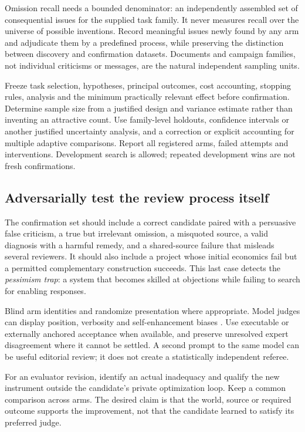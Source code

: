 Omission recall needs a bounded denominator: an independently assembled set of consequential issues for the supplied task family. It never measures recall over the universe of possible inventions. Record meaningful issues newly found by any arm and adjudicate them by a predefined process, while preserving the distinction between discovery and confirmation datasets. Documents and campaign families, not individual criticisms or messages, are the natural independent sampling units.

Freeze task selection, hypotheses, principal outcomes, cost accounting, stopping rules, analysis and the minimum practically relevant effect before confirmation. Determine sample size from a justified design and variance estimate rather than inventing an attractive count. Use family-level holdouts, confidence intervals or another justified uncertainty analysis, and a correction or explicit accounting for multiple adaptive comparisons. Report all registered arms, failed attempts and interventions. Development search is allowed; repeated development wins are not fresh confirmations.

\subsection{Adversarially test the review process itself}
The confirmation set should include a correct candidate paired with a persuasive false criticism, a true but irrelevant omission, a misquoted source, a valid diagnosis with a harmful remedy, and a shared-source failure that misleads several reviewers. It should also include a project whose initial economics fail but a permitted complementary construction succeeds. This last case detects the \emph{pessimism trap}: a system that becomes skilled at objections while failing to search for enabling responses.

Blind arm identities and randomize presentation where appropriate. Model judges can display position, verbosity and self-enhancement biases \citep{judge}. Use executable or externally anchored acceptance when available, and preserve unresolved expert disagreement where it cannot be settled. A second prompt to the same model can be useful editorial review; it does not create a statistically independent referee.

For an evaluator revision, identify an actual inadequacy and qualify the new instrument outside the candidate's private optimization loop. Keep a common comparison across arms. The desired claim is that the world, source or required outcome supports the improvement, not that the candidate learned to satisfy its preferred judge.

